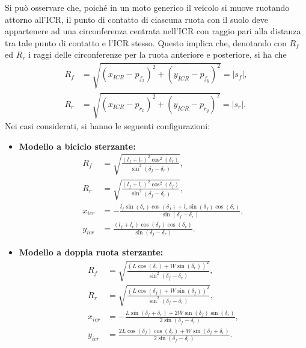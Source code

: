 Si può osservare che, poiché in un moto generico il veicolo si muove ruotando attorno all'ICR, il punto di contatto di ciascuna ruota con il suolo deve appartenere ad una circonferenza centrata nell'ICR con raggio pari alla distanza tra tale punto di contatto e l'ICR stesso. Questo implica che, denotando con $R_f$ ed $R_r$ i raggi delle circonferenze per la ruota anteriore e posteriore, si ha che
\begin{align}
    R_f & = \sqrt{(x_{ICR}-p_{f_x})^2 + (y_{ICR}-p_{f_y})^2} = |s_f|, \label{eq:Rf} \\
    R_r & = \sqrt{(x_{ICR}-p_{r_x})^2 + (y_{ICR}-p_{r_y})^2} = |s_r|. \label{eq:Rr}
\end{align}
Nei casi considerati, si hanno le seguenti configurazioni:
\begin{itemize}
    \item \textbf{Modello a biciclo sterzante:}
          \begin{align}
              R_f     & =\sqrt{\frac{(l_{f} + l_{r})^{2} \cos^{2}{(\delta_{r} )}}{\sin^{2}{(\delta_{f} - \delta_{r} )}}}, \label{eq:Rf_bicycle}                                            \\
              R_r     & = \sqrt{\frac{(l_{f} + l_{r})^{2} \cos^{2}{(\delta_{f} )}}{\sin^{2}{(\delta_{f} - \delta_{r} )}}}, \label{eq:Rr_bicycle}                                           \\
              x_{icr} & =- \frac{l_{f} \sin{(\delta_{r} )} \cos{(\delta_{f} )} + l_{r} \sin{(\delta_{f} )} \cos{(\delta_{r} )}}{\sin{(\delta_{f} - \delta_{r} )}}, \label{eq:xicr_bicycle} \\
              y_{icr} & = \frac{(l_{f} + l_{r}) \cos{(\delta_{f} )} \cos{(\delta_{r} )}}{\sin{(\delta_{f} - \delta_{r} )}}. \label{eq:yicr_bicycle}
          \end{align}
    \item \textbf{Modello a doppia ruota sterzante:}
          \begin{align}
              R_f     & = \sqrt{\frac{(L \cos{(\delta_{r} )} + W \sin{(\delta_{r} )})^{2}}{\sin^{2}{(\delta_{f} - \delta_{r} )}}}, \label{eq:Rf_double}
              \\
              R_r     & =\sqrt{\frac{(L \cos{(\delta_{f} )} + W \sin{(\delta_{f} )})^{2}}{\sin^{2}{(\delta_{f} - \delta_{r} )}}}, \label{eq:Rr_double}                          \\
              x_{icr} & = - \frac{L \sin{(\delta_{f} + \delta_{r} )} + 2 W \sin{(\delta_{f} )} \sin{(\delta_{r} )}}{2 \sin{(\delta_{f} - \delta_{r} )}}, \label{eq:xicr_double}
              \\
              y_{icr} & = \frac{2 L \cos{(\delta_{f} )} \cos{(\delta_{r} )} + W \sin{(\delta_{f} + \delta_{r} )}}{2 \sin{(\delta_{f} - \delta_{r} )}}. \label{eq:yicr_double}
          \end{align}
\end{itemize}
